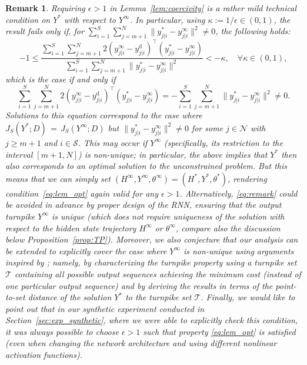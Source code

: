 \documentclass{article} %
\newtheorem{rem}{Remark}
\begin{document}
\begin{rem}\label{rem:epsilon}
	Requiring $\epsilon>1$ in Lemma~\ref{lem:coercivity} is a rather mild technical condition on $Y^*$ with respect to $Y^\infty$.
	In particular, using $\kappa:=1/\epsilon\in(0,1)$, the result fails only if, for $\sum_{i=1}^{S}\sum_{j=m+1}^{N}\|{y}_{j|i}^*-{y}_{j|i}^\infty\|^2 \neq 0$, the following holds:
	\begin{equation*}
		-1\leq \frac{\sum_{i=1}^{S}\sum_{j=m+1}^{N}2({y}_{j|i}^\infty-{y}_{j|i}^\mathrm{d})^\top({y}_{j|i}^*-{y}_{j|i}^\infty)}{\sum_{i=1}^{S}\sum_{j=m+1}^{N}\|{y}_{j|i}^*-{y}_{j|i}^\infty\|^2}
		<-\kappa, \quad \forall \kappa\in(0,1),
	\end{equation*}
	which is the case if and only if
	\begin{equation}
		\sum_{i=1}^{S}\sum_{j=m+1}^{N}2({y}_{j|i}^\infty-{y}_{j|i}^\mathrm{d})^\top({y}_{j|i}^*-{y}_{j|i}^\infty)=-\sum_{i=1}^{S}\sum_{j=m+1}^{N}\|{y}_{j|i}^*-{y}_{j|i}^\infty\|^2\neq 0. \label{eq:remark}
	\end{equation}	
	Solutions to this equation correspond to the case where $J_S(Y^*;D){\,=\,}J_S(Y^\infty;D)$ but $\|{y}_{j|i}^*-{y}_{j|i}^\infty\|^2\neq0$ for some $j\in\mathcal{N}$ with $j\geq m+1$ and $i\in\mathcal{S}$.
	This may occur if $Y^\infty$ (specifically, its restriction to the interval $[m+1,N]$) is non-unique; in particular, the above implies that $Y^*$ then also corresponds to an optimal solution to the unconstrained problem.
	But this means that we can simply set $(H^\infty,Y^\infty,\theta^\infty) = (H^*,Y^*,\theta^*)$, rendering condition~\eqref{eq:lem_opt} again valid for any $\epsilon>1$.
	Alternatively, \eqref{eq:remark} could be avoided in advance by proper design of the RNN, ensuring that the output turnpike $Y^\infty$ is unique (which does \emph{not} require uniqueness of the solution with respect to the hidden state trajectory $H^\infty$ or $\theta^\infty$, compare also the discussion below Proposition~\ref{prop:TP}).
	Moreover, we also conjecture that our analysis can be extended to explicitly cover the case where $Y^\infty$ is non-unique using arguments inspired by \citet{Trelat2018a}; namely, by characterizing the turnpike property using a turnpike set $\mathcal{T}$ containing all possible output sequences achieving the minimum cost (instead of one particular output sequence) and by deriving the results in terms of the point-to-set distance of the solution $Y^*$ to the turnpike set $\mathcal{T}$.
	Finally, we would like to point out that in our synthetic experiment conducted in Section~\ref{sec:exp_synthetic}, where we were able to explicitly check this condition, it was always possible to choose $\epsilon>1$ such that property \eqref{eq:lem_opt} is satisfied (even when changing the network architecture and using different nonlinear activation functions).
\end{rem}
\end{document}
